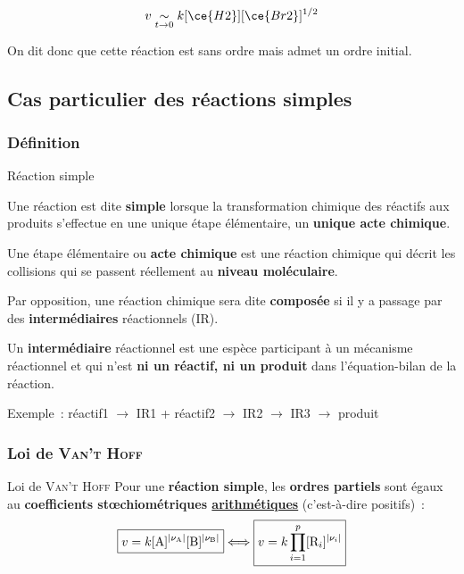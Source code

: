 \documentclass[../main/main.tex]{subfiles}
\begin{document}
\[v \underset{t\rightarrow0}{\sim} k [\ce{H2}][\ce{Br2}]^{1/2}\]

On dit donc que cette réaction est sans ordre mais admet un ordre initial.

\subsection{Cas particulier des réactions simples}
\subsubsection{Définition}
\begin{defi}[label=def:reacsimple]{Réaction simple}

    Une réaction est dite \textbf{simple} lorsque la transformation chimique des
    réactifs aux produits s'effectue en une unique étape élémentaire, un
    \textbf{unique acte chimique}.\bigbreak

    Une étape élémentaire ou \textbf{acte chimique} est une réaction chimique
    qui décrit les collisions qui se passent réellement au \textbf{niveau
    moléculaire}.\bigbreak

    Par opposition, une réaction chimique sera dite \textbf{composée} si il y a
    passage par des \textbf{intermédiaires} réactionnels (IR).\bigbreak

    Un \textbf{intermédiaire} réactionnel est une espèce participant à un
    mécanisme réactionnel et qui n'est \textbf{ni un réactif, ni un produit}
    dans l'équation-bilan de la réaction.\bigbreak

    Exemple~: réactif1 $\rightarrow$ IR1 + réactif2 $\rightarrow$ IR2
    $\rightarrow$ IR3 $\rightarrow$ produit 
\end{defi}

\subsubsection{Loi de \textsc{Van't Hoff}}
\begin{loi}[label=loi:vanthoff, heart]{Loi de \textsc{Van't Hoff}}
    Pour une \textbf{réaction simple}, les \textbf{ordres partiels} sont égaux
    au \textbf{coefficients stœchiométriques \underline{arithmétiques}}
    (c'est-à-dire positifs)~:
    {
    \[\boxed{v = k[{\rm A}]^{\left| \nu_{\rm A} \right|}
                  [{\rm B}]^{\left| \nu_{\rm B} \right|}}
      \Longleftrightarrow
      \boxed{v = k\prod_{i=1}^{p}[{\rm R}_i]^{\left| \nu_i \right|}}
    \]}\vspace{-12pt}
\end{loi}
\end{document}
